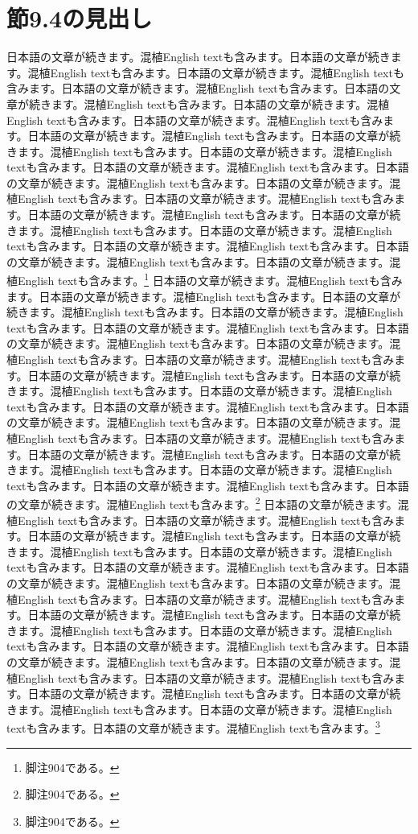 \documentclass[pdflatex,book]{jlreq}
\begin{document}
\section{節9.4の見出し}
日本語の文章が続きます。混植English textも含みます。日本語の文章が続きます。混植English textも含みます。日本語の文章が続きます。混植English textも含みます。日本語の文章が続きます。混植English textも含みます。日本語の文章が続きます。混植English textも含みます。日本語の文章が続きます。混植English textも含みます。日本語の文章が続きます。混植English textも含みます。日本語の文章が続きます。混植English textも含みます。日本語の文章が続きます。混植English textも含みます。日本語の文章が続きます。混植English textも含みます。日本語の文章が続きます。混植English textも含みます。日本語の文章が続きます。混植English textも含みます。日本語の文章が続きます。混植English textも含みます。日本語の文章が続きます。混植English textも含みます。日本語の文章が続きます。混植English textも含みます。日本語の文章が続きます。混植English textも含みます。日本語の文章が続きます。混植English textも含みます。日本語の文章が続きます。混植English textも含みます。日本語の文章が続きます。混植English textも含みます。日本語の文章が続きます。混植English textも含みます。\footnote{脚注904である。}
日本語の文章が続きます。混植English textも含みます。日本語の文章が続きます。混植English textも含みます。日本語の文章が続きます。混植English textも含みます。日本語の文章が続きます。混植English textも含みます。日本語の文章が続きます。混植English textも含みます。日本語の文章が続きます。混植English textも含みます。日本語の文章が続きます。混植English textも含みます。日本語の文章が続きます。混植English textも含みます。日本語の文章が続きます。混植English textも含みます。日本語の文章が続きます。混植English textも含みます。日本語の文章が続きます。混植English textも含みます。日本語の文章が続きます。混植English textも含みます。日本語の文章が続きます。混植English textも含みます。日本語の文章が続きます。混植English textも含みます。日本語の文章が続きます。混植English textも含みます。日本語の文章が続きます。混植English textも含みます。日本語の文章が続きます。混植English textも含みます。日本語の文章が続きます。混植English textも含みます。日本語の文章が続きます。混植English textも含みます。日本語の文章が続きます。混植English textも含みます。\footnote{脚注904である。}
日本語の文章が続きます。混植English textも含みます。日本語の文章が続きます。混植English textも含みます。日本語の文章が続きます。混植English textも含みます。日本語の文章が続きます。混植English textも含みます。日本語の文章が続きます。混植English textも含みます。日本語の文章が続きます。混植English textも含みます。日本語の文章が続きます。混植English textも含みます。日本語の文章が続きます。混植English textも含みます。日本語の文章が続きます。混植English textも含みます。日本語の文章が続きます。混植English textも含みます。日本語の文章が続きます。混植English textも含みます。日本語の文章が続きます。混植English textも含みます。日本語の文章が続きます。混植English textも含みます。日本語の文章が続きます。混植English textも含みます。日本語の文章が続きます。混植English textも含みます。日本語の文章が続きます。混植English textも含みます。日本語の文章が続きます。混植English textも含みます。日本語の文章が続きます。混植English textも含みます。日本語の文章が続きます。混植English textも含みます。日本語の文章が続きます。混植English textも含みます。\footnote{脚注904である。}
\end{document}
